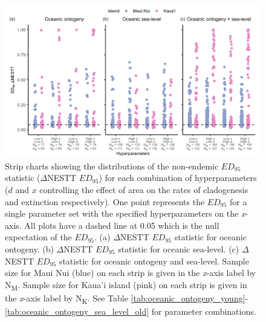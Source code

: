 \begin{figure}
    \centering
    \includegraphics[width=\textwidth]{JBI-21-0508_FigS3.png}
    \caption{Strip charts showing the distributions of the non-endemic $ED_{95}$ statistic ($\Delta$NESTT $ED_{95}$) for each combination of hyperparameters ($d$ and $x$ controlling the effect of area on the rates of cladogenesis and extinction respectively). One point represents the $ED_{95}$ for a single parameter set with the specified hyperparameters on the \textit{x}-axis. All plots have a dashed line at 0.05 which is the null expectation of the $ED_{95}$. (a) $\Delta$NESTT $ED_{95}$ statistic for oceanic ontogeny. (b) $\Delta$NESTT $ED_{95}$ statistic for oceanic sea-level. (c) $\Delta$NESTT $ED_{95}$ statistic for oceanic ontogeny and sea-level. Sample size for Maui Nui (blue) on each strip is given in the \textit{x}-axis label by N\textsubscript{M}. Sample size for Kaua'i island (pink) on each strip is given in the \textit{x}-axis label by N\textsubscript{K}. See Table \ref{tab:oceanic_ontogeny_young}-\ref{tab:oceanic_ontogeny_sea_level_old} for parameter combinations.}
    \label{fig:Hyperparameters_nonendemic}
\end{figure}
 
